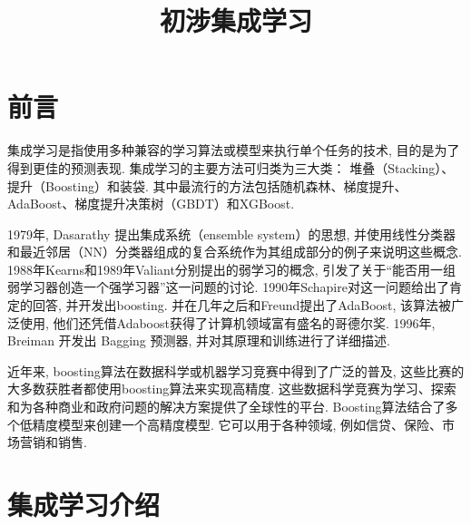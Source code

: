 \documentclass[lang=cn,11pt]{elegantpaper}
\title{初涉集成学习}
\date{}
\begin{document}
\newpage
\maketitle

	
\tableofcontents
\thispagestyle{empty}
\newpage
\normalsize
{}


\section{前言}

集成学习是指使用多种兼容的学习算法或模型来执行单个任务的技术, 目的是为了得到更佳的预测表现. 集成学习的主要方法可归类为三大类： 堆叠（Stacking）、提升（Boosting）和装袋. 其中最流行的方法包括随机森林、梯度提升、AdaBoost、梯度提升决策树（GBDT）和XGBoost. 

1979年, Dasarathy 提出集成系统（ensemble system）的思想, 并使用线性分类器和最近邻居（NN）分类器组成的复合系统作为其组成部分的例子来说明这些概念. 1988年Kearns和1989年Valiant分别提出的弱学习的概念, 引发了关于“能否用一组弱学习器创造一个强学习器”这一问题的讨论. 1990年Schapire对这一问题给出了肯定的回答, 并开发出boosting. 并在几年之后和Freund提出了AdaBoost, 该算法被广泛使用, 他们还凭借Adaboost获得了计算机领域富有盛名的哥德尔奖. 1996年, Breiman 开发出 Bagging 预测器, 并对其原理和训练进行了详细描述. 

近年来, boosting算法在数据科学或机器学习竞赛中得到了广泛的普及, 这些比赛的大多数获胜者都使用boosting算法来实现高精度. 这些数据科学竞赛为学习、探索和为各种商业和政府问题的解决方案提供了全球性的平台. Boosting算法结合了多个低精度模型来创建一个高精度模型. 它可以用于各种领域, 例如信贷、保险、市场营销和销售. 

\section{集成学习介绍}
\end{document}
